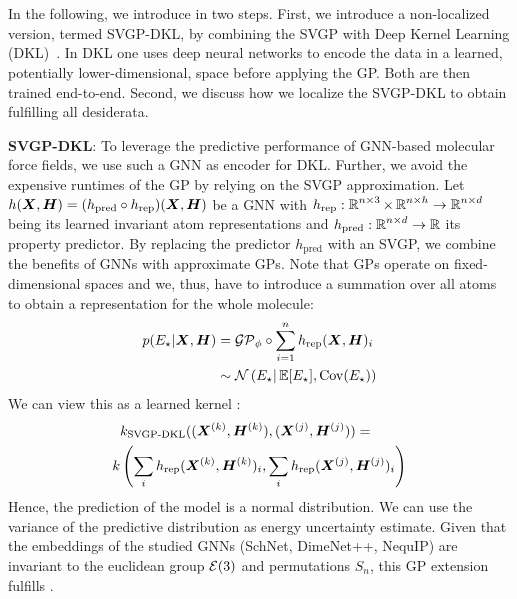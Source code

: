 \section{\ours{}}\label{sec:method}
In the following, we introduce \oursacro{} in two steps.
First, we introduce a non-localized version, termed SVGP-DKL, by combining the SVGP with Deep Kernel Learning (DKL)~\citep{wilson2015Deep}.
In DKL one uses deep neural networks to encode the data in a learned, potentially lower-dimensional, space before applying the GP. Both are then trained end-to-end.
Second, we discuss how we localize the SVGP-DKL to obtain \oursacro{} fulfilling all desiderata.

\textbf{SVGP-DKL}:
To leverage the predictive performance of GNN-based molecular force fields, we use such a GNN as encoder for DKL.
Further, we avoid the expensive runtimes of the GP by relying on the SVGP approximation.
Let $h(\bm{X}, \bm{H}) = (h_\text{pred} \circ h_{\text{rep}})(\bm{X}, \bm{H}) $ be a GNN with $h_\text{rep}:\operatorname{\mathbb{R}}^{n\times 3} \times \operatorname{\mathbb{R}}^{n \times h} \rightarrow \operatorname{\mathbb{R}}^{n \times d}$ being its learned invariant atom representations and $h_\text{pred}:\operatorname{\mathbb{R}}^{n \times d} \rightarrow \operatorname{\mathbb{R}}$ its property predictor.
By replacing the predictor $h_\text{pred}$ with an SVGP, we combine the benefits of GNNs with approximate GPs.
Note that GPs operate on fixed-dimensional spaces and we, thus, have to introduce a summation over all atoms to obtain a representation for the whole molecule:
\begin{equation}
\begin{aligned}
p(E_\star \vert \bm{X}, \bm{H}) &= \mathcal{GP}_\phi \circ \sum_{i=1}^n h_{\text{rep}}(\bm{X}, \bm{H})_i\\ &\sim \mathcal{N}\left(E_\star \vert \operatorname{\mathbb{E}} [E_\star], \mathrm{Cov}(E_\star)\right)\label{eq:global_gp}
\end{aligned}
\end{equation}
We can view this as a learned kernel \cite{wilson2015Deep}: 
\begin{equation}
\begin{aligned}
    &k_{\text{SVGP-DKL}}((\bm{X}^{(k)}, \bm{H}^{(k)}),(\bm{X}^{(j)}, \bm{H}^{(j)})) =\\ k&\left(\sum_i h_{\text{rep}}(\bm{X}^{(k)}, \bm{H}^{(k)})_i, \sum_i h_{\text{rep}}(\bm{X}^{(j)}, \bm{H}^{(j)})_i\right)
\end{aligned}
\end{equation}
Hence, the prediction of the model is a normal distribution. We can use the variance of the predictive distribution as energy uncertainty estimate. Given that the embeddings of the studied GNNs (SchNet, DimeNet++, NequIP) are invariant to the euclidean group $\mathcal{E}(3)$ and permutations $S_n$, this GP extension fulfills \desone{}.  

